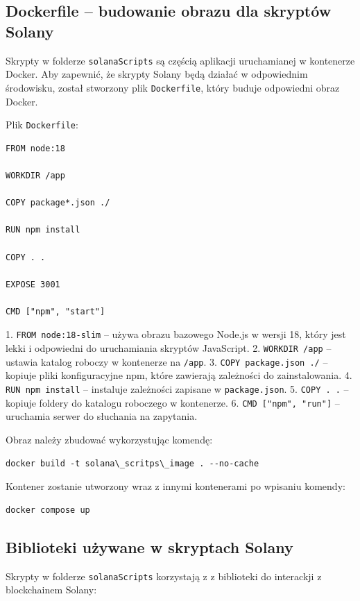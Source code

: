 \subsection{Dockerfile – budowanie obrazu dla skryptów Solany}

Skrypty w folderze \texttt{solanaScripts} są częścią aplikacji uruchamianej w kontenerze Docker. Aby zapewnić, że skrypty Solany będą działać w odpowiednim środowisku, został stworzony plik \texttt{Dockerfile}, który buduje odpowiedni obraz Docker.

Plik \texttt{Dockerfile}:

\begin{lstlisting}
FROM node:18

WORKDIR /app

COPY package*.json ./

RUN npm install

COPY . .

EXPOSE 3001

CMD ["npm", "start"]
\end{lstlisting}

1. \texttt{FROM node:18-slim} – używa obrazu bazowego Node.js w wersji 18, który jest lekki i odpowiedni do uruchamiania skryptów JavaScript.
2. \texttt{WORKDIR /app} – ustawia katalog roboczy w kontenerze na \texttt{/app}.
3. \texttt{COPY package.json ./} – kopiuje pliki konfiguracyjne npm, które zawierają zależności do zainstalowania.
4. \texttt{RUN npm install} – instaluje zależności zapisane w \texttt{package.json}.
5. \texttt{COPY . .} – kopiuje foldery do katalogu roboczego w kontenerze.
6. \texttt{CMD ["npm", "run"]} – uruchamia serwer do słuchania na zapytania.

Obraz należy zbudować wykorzystując komendę:
\begin{lstlisting}
docker build -t solana\_scritps\_image . --no-cache
\end{lstlisting}

Kontener zostanie utworzony wraz z innymi kontenerami po wpisaniu komendy:

\begin{lstlisting}
docker compose up
\end{lstlisting}

\subsection{Biblioteki używane w skryptach Solany}

Skrypty w folderze \texttt{solanaScripts} korzystają z z biblioteki do interackji z blockchainem Solany:

